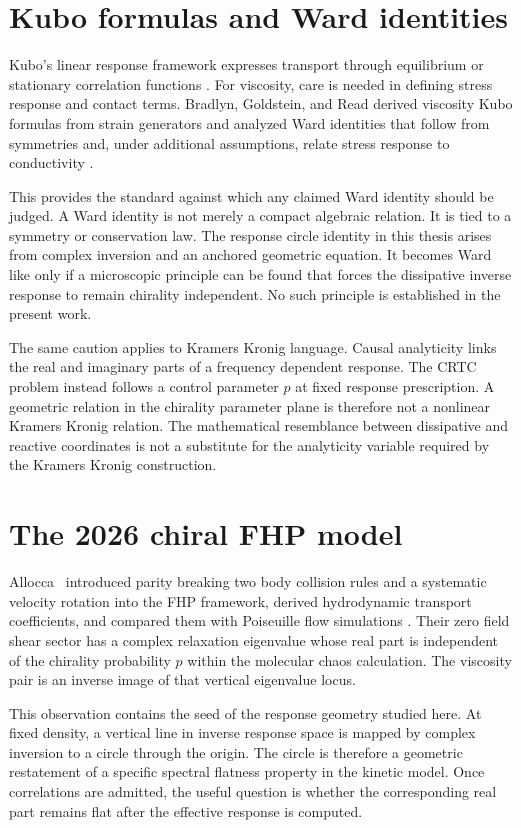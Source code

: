 \section{Kubo formulas and Ward identities}
Kubo's linear response framework expresses transport through equilibrium or stationary correlation functions \cite{Kubo1957}. For viscosity, care is needed in defining stress response and contact terms. Bradlyn, Goldstein, and Read derived viscosity Kubo formulas from strain generators and analyzed Ward identities that follow from symmetries and, under additional assumptions, relate stress response to conductivity \cite{Bradlyn2012}.

This provides the standard against which any claimed Ward identity should be judged. A Ward identity is not merely a compact algebraic relation. It is tied to a symmetry or conservation law. The response circle identity in this thesis arises from complex inversion and an anchored geometric equation. It becomes Ward like only if a microscopic principle can be found that forces the dissipative inverse response to remain chirality independent. No such principle is established in the present work.

The same caution applies to Kramers Kronig language. Causal analyticity links the real and imaginary parts of a frequency dependent response. The CRTC problem instead follows a control parameter $p$ at fixed response prescription. A geometric relation in the chirality parameter plane is therefore not a nonlinear Kramers Kronig relation. The mathematical resemblance between dissipative and reactive coordinates is not a substitute for the analyticity variable required by the Kramers Kronig construction.

\section{The 2026 chiral FHP model}
Allocca \etal\ introduced parity breaking two body collision rules and a systematic velocity rotation into the FHP framework, derived hydrodynamic transport coefficients, and compared them with Poiseuille flow simulations \cite{Allocca2026}. Their zero field shear sector has a complex relaxation eigenvalue whose real part is independent of the chirality probability $p$ within the molecular chaos calculation. The viscosity pair is an inverse image of that vertical eigenvalue locus.

This observation contains the seed of the response geometry studied here. At fixed density, a vertical line in inverse response space is mapped by complex inversion to a circle through the origin. The circle is therefore a geometric restatement of a specific spectral flatness property in the kinetic model. Once correlations are admitted, the useful question is whether the corresponding real part remains flat after the effective response is computed.

